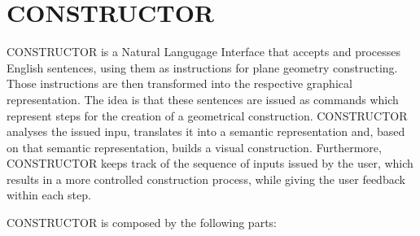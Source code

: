 \section{CONSTRUCTOR}
CONSTRUCTOR \cite{alexin_1990} is a Natural Langugage Interface that accepts and processes English sentences,
using them as instructions for plane geometry constructing.
Those instructions are then transformed into the respective graphical representation.
The idea is that these sentences are issued as commands which represent steps for the creation of a geometrical construction.
CONSTRUCTOR analyses the issued inpu, translates it into a semantic representation and, based on that semantic representation, builds a visual construction.
Furthermore, CONSTRUCTOR keeps track of the sequence of inputs issued by the user, which results in a more controlled construction process,
while giving the user feedback within each step.

\noindent CONSTRUCTOR is composed by the following parts:

